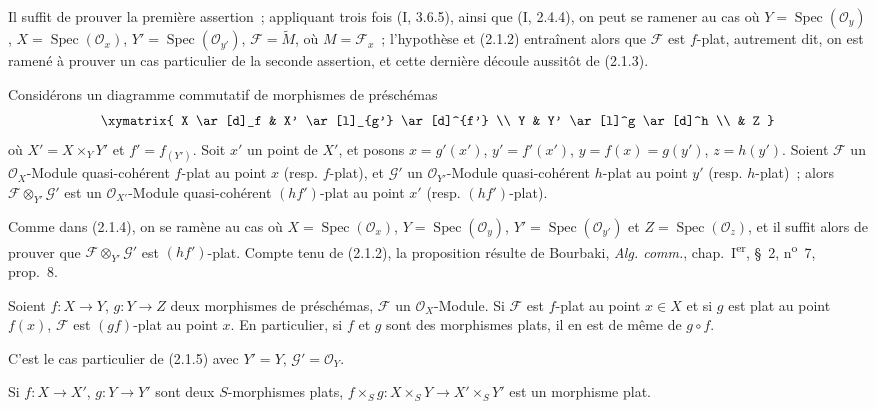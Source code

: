 Il suffit de prouver la première assertion~; appliquant trois fois (I, 3.6.5),
ainsi que (I, 2.4.4), on peut se ramener au cas où
$Y=\operatorname{Spec}(\mathcal O_y)$, $X=\operatorname{Spec}(\mathcal O_x)$,
$Y'=\operatorname{Spec}(\mathcal O_{y'})$, $\mathscr F=\widetilde M$, où
$M=\mathscr F_x$~; l'hypothèse et (2.1.2) entraînent alors que $\mathscr F$
est $f$-plat, autrement dit, on est ramené à prouver un cas particulier de la
seconde assertion, et cette dernière découle aussitôt de (2.1.3).

\begin{proposition}[2.1.5]
\label{IV.2.1.5-fr}
Considérons un diagramme commutatif de morphismes de préschémas
\[
\xymatrix{
  X \ar[d]_f & X' \ar[l]_{g'} \ar[d]^{f'} \\
  Y & Y' \ar[l]^g \ar[d]^h \\
  & Z
}
\]
où $X'=X\times_Y Y'$ et $f'=f_{(Y')}$. Soit $x'$ un point de $X'$, et
posons $x=g'(x')$, $y'=f'(x')$, $y=f(x)=g(y')$, $z=h(y')$. Soient
$\mathscr F$ un $\mathcal O_X$-Module quasi-cohérent $f$-plat au point $x$
(resp. $f$-plat), et $\mathscr G'$ un $\mathcal O_{Y'}$-Module quasi-cohérent
$h$-plat au point $y'$ (resp. $h$-plat)~; alors
$\mathscr F\otimes_{Y'}\mathscr G'$ est un $\mathcal O_{X'}$-Module
quasi-cohérent $(hf')$-plat au point $x'$ (resp. $(hf')$-plat).
\end{proposition}

Comme dans (2.1.4), on se ramène au cas où
$X=\operatorname{Spec}(\mathcal O_x)$, $Y=\operatorname{Spec}(\mathcal O_y)$,
$Y'=\operatorname{Spec}(\mathcal O_{y'})$ et
$Z=\operatorname{Spec}(\mathcal O_z)$, et il suffit alors de prouver que
$\mathscr F\otimes_{Y'}\mathscr G'$ est $(hf')$-plat. Compte tenu de
(2.1.2), la proposition résulte de Bourbaki, \emph{Alg. comm.},
chap.~I\textsuperscript{er}, \S~2, n\textsuperscript{o}~7, prop.~8.

\begin{corollary}[2.1.6]
\label{IV.2.1.6-fr}
Soient $f:X\to Y$, $g:Y\to Z$ deux morphismes de préschémas, $\mathscr F$ un
$\mathcal O_X$-Module. Si $\mathscr F$ est $f$-plat au point $x\in X$ et si
$g$ est plat au point $f(x)$, $\mathscr F$ est $(gf)$-plat au point $x$. En
particulier, si $f$ et $g$ sont des morphismes plats, il en est de même de
$g\circ f$.
\end{corollary}

C'est le cas particulier de (2.1.5) avec $Y'=Y$, $\mathscr G'=\mathcal O_Y$.

\begin{corollary}[2.1.7]
\label{IV.2.1.7-fr}
Si $f:X\to X'$, $g:Y\to Y'$ sont deux $S$-morphismes plats,
$f\times_S g:X\times_S Y\to X'\times_S Y'$ est un morphisme plat.
\end{corollary}

